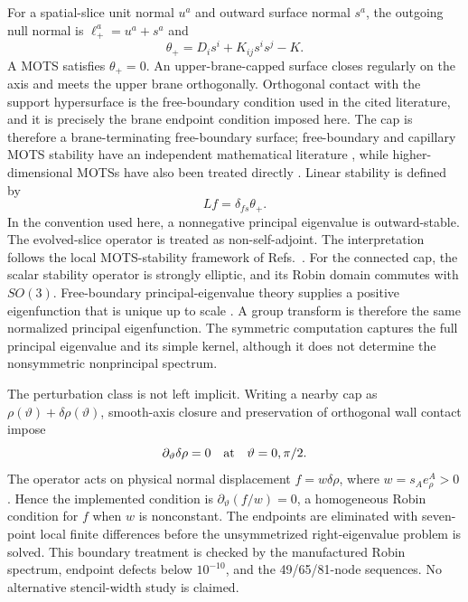 \documentclass[11pt]{article}
\begin{document}
For a spatial-slice unit normal $u^a$ and outward surface normal $s^a$, the
outgoing null normal is $\ell_+^a=u^a+s^a$ and
\begin{equation}
\theta_+=D_i s^i+K_{ij}s^is^j-K.
\end{equation}
A MOTS satisfies $\theta_+=0$.  An upper-brane-capped surface closes regularly on the
axis and meets the upper brane orthogonally.  Orthogonal contact with the
support hypersurface is the free-boundary condition used in the cited
literature, and it is precisely the brane endpoint condition imposed here.
The cap is therefore a brane-terminating free-boundary surface; free-boundary and
capillary MOTS stability have an independent mathematical literature
\cite{AlaeeLesourdYau2020,Chai2024,Mendes2021,Lee2025,deAlmeidaMendes2026}, while higher-dimensional MOTSs
have also been treated directly \cite{PaetzSimon2013}.  Linear stability is defined by
\begin{equation}
L f=\delta_{f s}\theta_+.
\end{equation}
In the convention used here, a nonnegative principal eigenvalue is
outward-stable.  The evolved-slice operator is treated as non-self-adjoint.
The interpretation follows the local MOTS-stability framework of
Refs.~\cite{AnderssonMarsSimon2005,AnderssonMarsSimon2008,AnderssonMarsMetzgerSimon2009,PookKolbEtAl2019}.
For the connected cap, the scalar stability operator is strongly elliptic,
and its Robin domain commutes with $SO(3)$.  Free-boundary
principal-eigenvalue theory supplies a positive eigenfunction that is unique
up to scale \cite{AlaeeLesourdYau2020,deAlmeidaMendes2026}.  A group transform
is therefore the same normalized principal eigenfunction.  The symmetric
computation captures the full principal eigenvalue and its simple kernel,
although it does not determine the nonsymmetric nonprincipal spectrum.

The perturbation class is not left implicit.  Writing a nearby cap as
$\rho(\vartheta)+\delta\rho(\vartheta)$, smooth-axis closure and preservation
of orthogonal wall contact impose
\begin{equation}
\partial_\vartheta\delta\rho=0
\quad\hbox{at}\quad \vartheta=0,\pi/2.
\end{equation}
The operator acts on physical normal displacement
$f=w\delta\rho$, where $w=s_Ae_\rho^A>0$.  Hence the implemented condition is
$\partial_\vartheta(f/w)=0$, a homogeneous Robin condition for $f$ when $w$
is nonconstant.  The endpoints are eliminated with seven-point local finite
differences before the unsymmetrized right-eigenvalue problem is solved.  This
boundary treatment is checked by the manufactured Robin spectrum, endpoint
defects below $10^{-10}$, and the 49/65/81-node sequences.  No alternative
stencil-width study is claimed.
\end{document}
